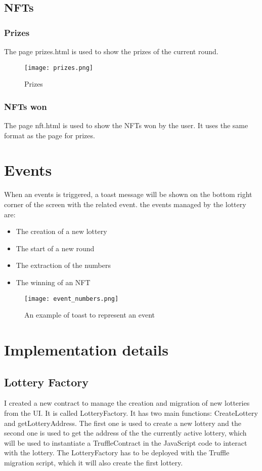 \documentclass[11pt]{article}
\begin{document}
\subsection{NFTs}
\subsubsection*{Prizes}
The page prizes.html is used to show the prizes of the current round.
\begin{figure}[h!]
\centering
\texttt{[image: prizes.png]}
\caption{Prizes}
\label{fig:prizes}
\end{figure}

\subsubsection*{NFTs won}
The page nft.html is used to show the NFTs won by the user. It uses the
same format as the page for prizes.
\section{Events}
When an events is triggered, a toast message will be shown on the bottom right corner of the screen
with the related event.
the events managed by the lottery are:
\begin{itemize}
\item The creation of a new lottery
\item The start of a new round
\item The extraction of the numbers
\item The winning of an NFT
\end{itemize}
\begin{figure}[h!]
\centering
\texttt{[image: event\_numbers.png]}
\caption{An example of toast to represent an event}
\label{fig:events}

\end{figure}


\section{Implementation details}
\subsection{Lottery Factory}
I created a new contract to manage the creation and migration of new lotteries from the
UI. It is called LotteryFactory. It has two main functions: CreateLottery and getLotteryAddress.
The first one is used to create a new lottery and the second one is used to get the address of the
the currently active lottery, which will be used to instantiate a TruffleContract in the JavaScript
code to interact with the lottery. The LotteryFactory has to be deployed with
the Truffle migration script, which it will also create the first lottery.
\end{document}
